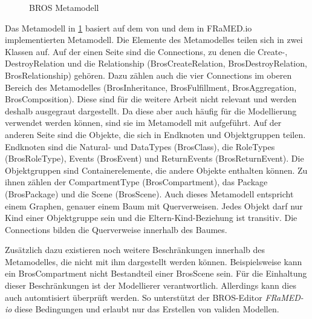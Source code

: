 \begin{figure}
%
    \caption{BROS Metamodell}%
    \label{fig:brosMetamodel}
\end{figure}


Das Metamodell in \cref{fig:brosMetamodel} basiert auf dem von \cite{Schoen} und dem in FRaMED.io implementierten Metamodell.
Die Elemente des Metamodelles teilen sich in zwei Klassen auf.
Auf der einen Seite sind die Connections, zu denen die Create-, DestroyRelation und die Relationship (BrosCreateRelation, BrosDestroyRelation, BrosRelationship) gehören.
Dazu zählen auch die vier Connections im oberen Bereich des Metamodelles (BrosInheritance, BrosFulfillment, BrosAggregation, BrosComposition).
Diese sind für die weitere Arbeit nicht relevant und werden deshalb ausgegraut dargestellt.
Da diese aber auch häufig für die Modellierung verwendet werden können, sind sie im Metamodell mit aufgeführt.
Auf der anderen Seite sind die Objekte, die sich in Endknoten und Objektgruppen teilen.
Endknoten sind die Natural- und DataTypes (BrosClass), die RoleTypes (BrosRoleType), Events (BrosEvent) und ReturnEvents (BrosReturnEvent).
Die Objektgruppen sind Containerelemente, die andere Objekte enthalten können.
Zu ihnen zählen der CompartmentType (BrosCompartment), das Package (BrosPackage) und die Scene (BrosScene).
Auch dieses Metamodell entspricht einem Graphen, genauer einem Baum mit Querverweisen.
Jedes Objekt darf nur Kind einer Objektgruppe sein und die Eltern-Kind-Beziehung ist transitiv.
Die Connections bilden die Querverweise innerhalb des Baumes.

Zusätzlich dazu existieren noch weitere Beschränkungen innerhalb des Metamodelles, die nicht mit ihm dargestellt werden können.
Beispielsweise kann ein BrosCompartment nicht Bestandteil einer BrosScene sein.
Für die Einhaltung dieser Beschränkungen ist der Modellierer verantwortlich.
Allerdings kann dies auch automtisiert überprüft werden.
So unterstützt der BROS-Editor \emph{FRaMED-io} diese Bedingungen und erlaubt nur das Erstellen von validen Modellen.
